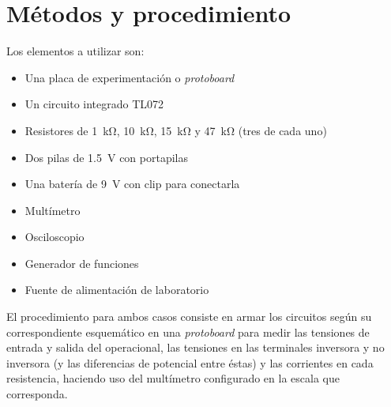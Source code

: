 \section{Métodos y procedimiento}

Los elementos a utilizar son:

\begin{itemize}
    \item Una placa de experimentación o \textit{protoboard}
    \item Un circuito integrado TL072
    \item Resistores de \SI{1}{\kilo\ohm}, \SI{10}{\kilo\ohm},
        \SI{15}{\kilo\ohm} y \SI{47}{\kilo\ohm} (tres de cada uno)
    \item Dos pilas de \SI{1.5}{\volt} con portapilas
    \item Una batería de \SI{9}{\volt} con clip para conectarla
    \item Multímetro
    \item Osciloscopio
    \item Generador de funciones
    \item Fuente de alimentación de laboratorio
\end{itemize}

El procedimiento para ambos casos consiste en armar los circuitos según su 
correspondiente esquemático en una \textit{protoboard} para medir las tensiones
de entrada y salida del operacional, las tensiones en las terminales inversora y
no inversora (y las diferencias de potencial entre éstas) y las corrientes en
cada resistencia, haciendo uso del multímetro configurado en la escala que
corresponda.
